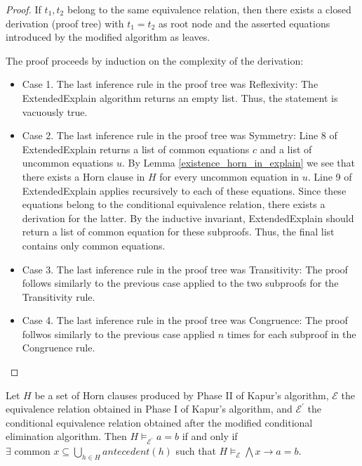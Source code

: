 \begin{proof} 
  If $t_1, t_2$ belong to the same equivalence relation,
  then there exists a closed derivation (proof tree) 
  with $t_1 = t_2$ as root node and the asserted
  equations introduced by the modified algorithm
  as leaves.

  The proof proceeds by induction on the complexity of the 
  derivation:

  \begin{itemize}
    \item Case 1. The last inference rule in the proof 
      tree was Reflexivity: The ExtendedExplain 
      algorithm returns an empty list. Thus, the
      statement is vacuously true.
    \item Case 2. The last inference rule in the proof 
      tree was Symmetry: Line 8 of ExtendedExplain
      returns a list of common equations $c$ and a list
      of uncommon equations $u$. 
      By Lemma \ref{existence_horn_in_explain}
      we see that there exists a Horn clause in $H$ for
      every uncommon equation in $u$. Line 9 of 
      ExtendedExplain applies recursively to each of 
      these equations. Since these equations belong
      to the conditional equivalence relation, there
      exists a derivation for the latter.
      By the inductive invariant, ExtendedExplain
      should return a list of common equation for 
      these subproofs. Thus, the final list contains
      only common equations.
    \item Case 3. The last inference rule in the proof 
      tree was Transitivity: The proof follows similarly
      to the previous case applied to the two subproofs
      for the Transitivity rule.
    \item Case 4. The last inference rule in the proof 
      tree was Congruence: The proof follwos similarly
      to the previous case applied $n$ times for each
      subproof in the Congruence rule.
  \end{itemize}
\end{proof}

\begin{corollary} \label{commonantecedentcorollary}
  Let $H$ be a set of Horn clauses produced by 
  Phase II of Kapur's algorithm, $\mathcal{E}$ the 
  equivalence relation obtained in Phase I of Kapur's 
  algorithm, and $\mathcal{E^{'}}$ the conditional 
  equivalence relation obtained after the modified
  conditional elimination algorithm. Then
  $H \models_{\mathcal{E^{'}}} a = b$ if and only if
  $\exists \text{ common } x \subseteq 
  \bigcup_{h \in H} antecedent(h)$ such that
  $H \models_{\mathcal{E}} \bigwedge x \rightarrow a = b$.
\end{corollary}

